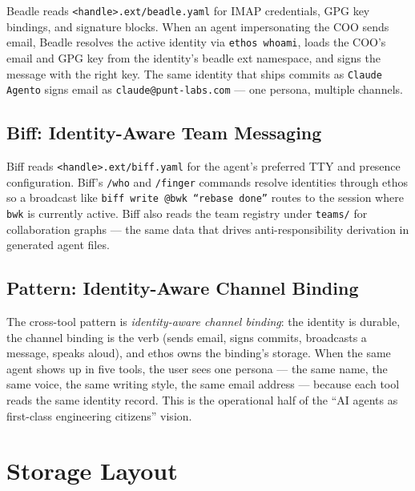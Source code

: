 \documentclass[a4paper,10pt]{article}
\newcommand{\cmd}[1]{\texttt{#1}}
\newcommand{\fpath}[1]{\texttt{#1}}
\begin{document}
Beadle reads \fpath{<handle>.ext/beadle.yaml} for IMAP credentials,
GPG key bindings, and signature blocks.  When an agent
impersonating the COO sends email, Beadle resolves the active
identity via \texttt{ethos whoami}, loads the COO's email and GPG
key from the identity's beadle ext namespace, and signs the message
with the right key.  The same identity that ships commits as
\texttt{Claude Agento} signs email as \texttt{claude@punt-labs.com}
--- one persona, multiple channels.

\subsection{Biff: Identity-Aware Team Messaging}

Biff reads \fpath{<handle>.ext/biff.yaml} for the agent's preferred
TTY and presence configuration.  Biff's \cmd{/who} and
\cmd{/finger} commands resolve identities through ethos so a
broadcast like \cmd{biff write @bwk ``rebase done''} routes to the
session where \texttt{bwk} is currently active.  Biff also reads
the team registry under \fpath{teams/} for collaboration graphs ---
the same data that drives anti-responsibility derivation in
generated agent files.

\subsection{Pattern: Identity-Aware Channel Binding}

The cross-tool pattern is \emph{identity-aware channel binding}:
the identity is durable, the channel binding is the verb (sends
email, signs commits, broadcasts a message, speaks aloud), and
ethos owns the binding's storage.  When the same agent shows up in
five tools, the user sees one persona --- the same name, the same
voice, the same writing style, the same email address --- because
each tool reads the same identity record.  This is the operational
half of the ``AI agents as first-class engineering citizens''
vision.

\section{Storage Layout}
\end{document}
